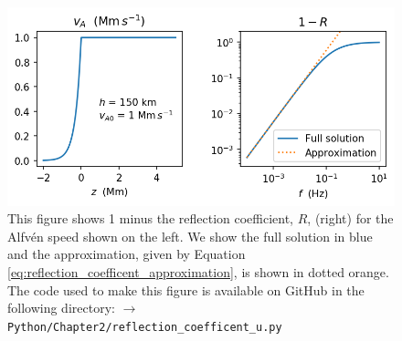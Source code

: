 \begin{figure}
    \centering
    \vspace{-20pt}
    \includegraphics{figures/chapter02/reflection_coefficent.png}
    \vspace{-20pt}
    \caption{This figure shows 1 minus the reflection coefficient, $R$, (right) for the Alfv\'en speed shown on the left. We show the full solution in blue and the approximation, given by Equation \eqref{eq:reflection_coefficent_approximation}, is shown in dotted orange. The code used to make this figure is available on GitHub in the following directory:\newline
    \texttt{$\rightarrow$ Python/Chapter2/reflection\_coefficent\_u.py}}
    \vspace{-10pt}
    \label{fig:reflection_coefficent}
\end{figure}

